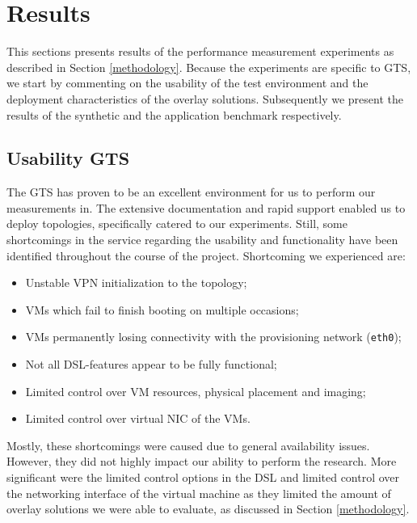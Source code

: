 \section{Results} \label{results}
This sections presents results of the performance measurement experiments as described in Section \ref{methodology}. Because the experiments are specific to GTS, we start by commenting on the usability of the test environment and the deployment characteristics of the overlay solutions. Subsequently we present the results of the synthetic and the application benchmark respectively. 

\subsection{Usability GTS} \label{usabilitygts}
The GTS has proven to be an excellent environment for us to perform our measurements in. The extensive documentation and rapid support enabled us to deploy topologies, specifically catered to our experiments. Still, some shortcomings in the service regarding the usability and functionality have been identified throughout the course of the project. Shortcoming we experienced are:

\begin{itemize}
  \setlength\itemsep{-1pt}
  \item Unstable VPN initialization to the topology;
  \item VMs which fail to finish booting on multiple occasions;
  \item VMs permanently losing connectivity with the provisioning network (\texttt{eth0});
  \item Not all DSL-features appear to be fully functional;
  \item Limited control over VM resources, physical placement and imaging;
  \item Limited control over virtual NIC of the VMs.
\end{itemize}
Mostly, these shortcomings were caused due to general availability issues. However, they did not highly impact our ability to perform the research. More significant were the limited control options in the DSL and limited control over the networking interface of the virtual machine as they limited the amount of overlay solutions we were able to evaluate, as discussed in Section \ref{methodology}.

